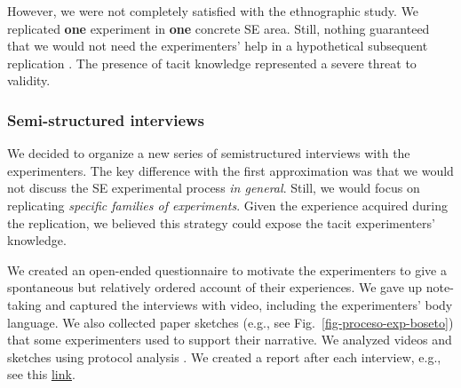 However, we were not completely satisfied with the ethnographic study. We replicated \textbf{one} experiment in \textbf{one} concrete SE area. Still, nothing guaranteed that we would not need the experimenters' help in a hypothetical subsequent replication \cite{Juristo-2012-replication-SE,Gomez-2014-understanding-replication}. The presence of tacit knowledge represented a severe threat to validity.

\subsubsection{Semi-structured interviews}
We decided to organize a new series of semistructured interviews with the experimenters. The key difference with the first approximation was that we would not discuss the SE experimental process \textit{in general}. Still, we would focus on replicating \textit{specific families of experiments}. Given the experience acquired during the replication, we believed this strategy could expose the tacit experimenters' knowledge.

We created an open-ended questionnaire to motivate the experimenters to give a spontaneous but relatively ordered account of their experiences. We gave up note-taking and captured the interviews with video, including the experimenters' body language. We also collected paper sketches (e.g., see Fig.~\ref{fig-proceso-exp-boseto}) that some experimenters used to support their narrative. We analyzed videos and sketches using protocol analysis \cite{Pressley-1995-verbal-protocols,sowden2020verbal}. We created a report after each interview, e.g., see this \href{https://zenodo.org/record/7102137#.YytgDOzMLUI}{\ul{link}}.

